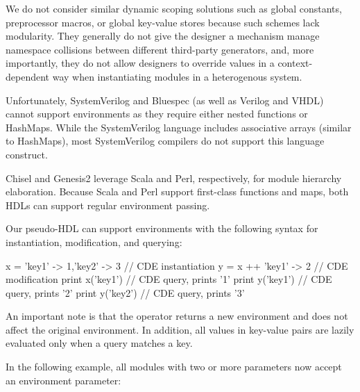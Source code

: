 We do not consider similar dynamic scoping solutions such as global constants, preprocessor macros, or global key-value stores because such schemes lack modularity.
They generally do not give the designer a mechanism manage namespace collisions between different third-party generators, 
and, more importantly, they do not allow designers to override values in a context-dependent way when instantiating modules in a heterogenous system.

Unfortunately, SystemVerilog and Bluespec (as well as Verilog and VHDL) cannot support environments as they require either nested functions or HashMaps. %
 While the SystemVerilog language includes associative arrays (similar to HashMaps), most SystemVerilog compilers do not support this language construct. 

Chisel and Genesis2 leverage Scala and Perl, respectively, for module hierarchy elaboration. Because Scala and Perl support first-class functions and maps, both HDLs can support regular environment passing.



Our pseudo-HDL can support environments with the following syntax for instantiation, modification, and querying:

\begin{phdl}
x = {'key1' -> 1,'key2' -> 3} // CDE instantiation
y = x ++ {'key1' -> 2}        // CDE modification
print x('key1')               // CDE query, prints '1'
print y('key1')               // CDE query, prints '2'
print y('key2')               // CDE query, prints '3'
\end{phdl}

An important note is that the \code{++}  operator returns a new environment and does not affect the original environment. In addition, all values in key-value pairs are lazily evaluated only when a query matches a key.

In the following example, all modules with two or more parameters now accept an environment parameter:



